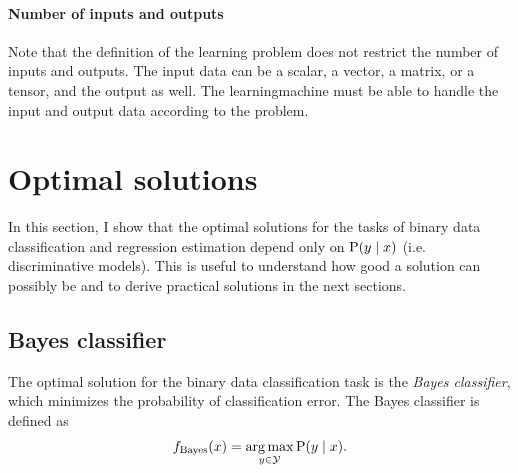 \paragraph{Number of inputs and outputs}
Note that the definition of the learning problem does not restrict the number of inputs
and outputs.  The input data can be a scalar, a vector, a matrix, or a tensor, and the
output as well.  The \gls{learningmachine} must be able to handle the input and output data
according to the problem.


\section{Optimal solutions}
\label{sec:optimal-solution}

In this section, I show that the optimal solutions for the tasks of binary data
classification and regression estimation depend only on $\operatorname{P}(y \mid x)$ (i.e.
discriminative models).  This is useful
to understand how good a solution can possibly be and to derive practical solutions in the
next sections.

\subsection{Bayes classifier}

The optimal solution for the binary data classification task is the \emph{Bayes
\gls{classifier}}, which minimizes the probability of classification error.  The Bayes
\gls{classifier} is defined as
\begin{equation*}
  f_\text{Bayes}(x) = \operatorname*{arg\,max}_{y \in \mathcal{Y}} \operatorname{P}(y \mid x)\text{.}
\end{equation*}

